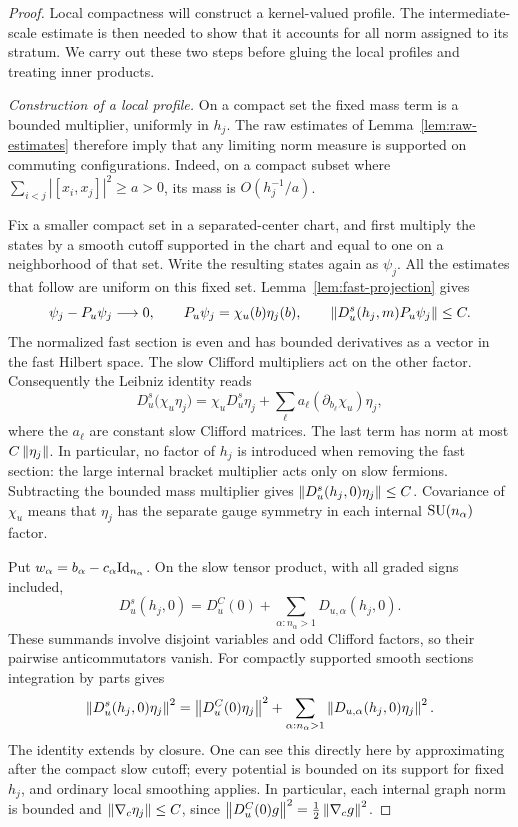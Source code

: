 \begin{proof}
Local compactness will construct a kernel-valued profile. The
intermediate-scale estimate is then needed to show that it accounts for
all norm assigned to its stratum. We carry out these two steps before
gluing the local profiles and treating inner products.

\smallskip\noindent\emph{Construction of a local profile.}
On a compact set the fixed mass term is a bounded multiplier, uniformly
in \(h_j\).
The raw estimates of Lemma~\ref{lem:raw-estimates} therefore imply that any
limiting norm measure is supported on commuting configurations. Indeed,
on a compact subset where
\(\sum_{i<j}|[x_i,x_j]|^2\ge a>0\), its mass is \(O(h_j^{-1}/a)\).

Fix a smaller compact set in a separated-center chart, and first multiply
the states by a smooth cutoff supported in the chart and equal to one on
a neighborhood of that set. Write the resulting states again as
\(\psi_j\). All the estimates that follow are uniform on this fixed set.
Lemma~\ref{lem:fast-projection} gives
\[
 \psi_j-P_u\psi_j\longrightarrow0,
 \qquad P_u\psi_j=\chi_u(b)\eta_j(b),
 \qquad \left\lVert D_u^s(h_j,m)P_u\psi_j\right\rVert\le C.
\]
The normalized fast section is even and has bounded derivatives as a
vector in the fast Hilbert space. The slow Clifford multipliers act on
the other factor. Consequently the Leibniz identity reads
\begin{equation}\label{prof:section-removal}
 D_u^s\bigl(\chi_u\eta_j\bigr)
 =\chi_uD_u^s\eta_j+
       \sum_\ell a_\ell(\partial_{b_\ell}\chi_u)\eta_j,
\end{equation}
where the \(a_\ell\) are constant slow Clifford matrices. The last term
has norm at most \(C\left\lVert \eta_j\right\rVert\). In particular, no factor of \(h_j\)
is introduced when removing the fast section: the large internal bracket
multiplier acts only on slow fermions. Subtracting the bounded mass
multiplier gives
\(\left\lVert D_u^s(h_j,0)\eta_j\right\rVert\le C\).
Covariance of \(\chi_u\) means that \(\eta_j\) has the separate gauge
symmetry in each internal \(\operatorname{SU}(n_\alpha)\) factor.

Put \(w_\alpha=b_\alpha-c_\alpha\mathrm{Id}_{n_\alpha}\). On the slow tensor
product, with all graded signs included,
\[
 D_u^s(h_j,0)=D_u^C(0)+\sum_{\alpha:n_\alpha>1}
                             D_{u,\alpha}(h_j,0).
\]
These summands involve disjoint variables and odd Clifford factors, so
their pairwise anticommutators vanish. For compactly supported smooth
sections integration by parts gives
\begin{equation}\label{prof:block-graph-identity}
 \left\lVert D_u^s(h_j,0)\eta_j\right\rVert^2
 =\left\lVert D_u^C(0)\eta_j\right\rVert^2+
       \sum_{\alpha:n_\alpha>1}
                         \left\lVert D_{u,\alpha}(h_j,0)\eta_j\right\rVert^2.
\end{equation}
The identity extends by closure. One can see this directly here by
approximating after the compact slow cutoff; every potential is bounded
on its support for fixed \(h_j\), and ordinary local smoothing applies.
In particular, each internal graph norm is bounded and
\(\left\lVert \nabla_c\eta_j\right\rVert\le C\), since
\(\left\lVert D_u^C(0)g\right\rVert^2=\tfrac12\left\lVert \nabla_cg\right\rVert^2\).


\end{proof}
